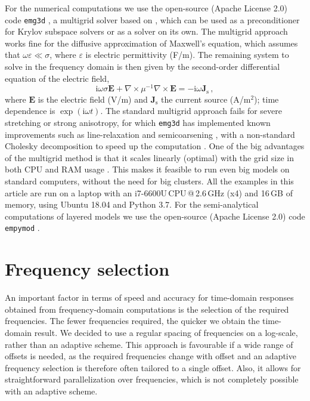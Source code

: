 \documentclass[
    manuscript,
  ]{geophysics}
\newcommand{\emg}[2]{\texttt{emg#1#2}\xspace}
\newcommand{\empymod}{\texttt{empymod}\xspace}
\begin{document}
For the numerical computations we use the open-source (Apache License 2.0) code
\emg3d \citep{JOSS.19.Werthmuller}, a multigrid solver based on
\cite{GP.06.Mulder}, which can be used as a preconditioner for Krylov subspace
solvers or as a solver on its own. The multigrid approach works fine for the
diffusive approximation of Maxwell's equation, which assumes that
$\omega\varepsilon \ll \sigma$, where $\varepsilon$ is electric permittivity
(F/m). The remaining system to solve in the frequency domain is then given by
the second-order differential equation of the electric field,
%
\begin{equation}
    \mathrm{i}\omega\sigma \mathbf{E} +
    \nabla \times \mu^{-1} \nabla \times \mathbf{E}
    = -\mathrm{i}\omega\mathbf{J}_\mathrm{s} \, ,
  \label{eq:maxwell}
\end{equation}
%
where $\mathbf{E}$ is the electric field (V/m) and $\mathbf{J}_\mathrm{s}$ the
current source (A/m$^2$); time dependence is $\exp(\mathrm{i}\omega t)$. The
standard multigrid approach fails for severe stretching or strong anisotropy,
for which \emg3d has implemented known improvements such as line-relaxation and
semicoarsening \citep{ECCFD.06.Jonsthovel}, with a non-standard Cholesky
decomposition to speed up the computation \citep{GEO.08.Mulder}. One of the big
advantages of the multigrid method is that it scales linearly (optimal) with
the grid size in both CPU and RAM usage \citep{B.Springer.20.Mulder}. This
makes it feasible to run even big models on standard computers, without the
need for big clusters. All the examples in this article are run on a laptop
with an i7-6600U\,CPU\,@\,2.6\,GHz (x4) and 16\,GB of memory, using Ubuntu
18.04 and Python 3.7. For the semi-analytical computations of layered models we
use the open-source (Apache License 2.0) code \empymod
\citep{GEO.17.Werthmuller}.

\section{Frequency selection}

An important factor in terms of speed and accuracy for time-domain responses
obtained from frequency-domain computations is the selection of the required
frequencies. The fewer frequencies required, the quicker we obtain the
time-domain result. We decided to use a regular spacing of frequencies on a
log-scale, rather than an adaptive scheme. This approach is favourable if a
wide range of offsets is needed, as the required frequencies change with offset
and an adaptive frequency selection is therefore often tailored to a single
offset. Also, it allows for straightforward parallelization over frequencies,
which is not completely possible with an adaptive scheme.
\end{document}
